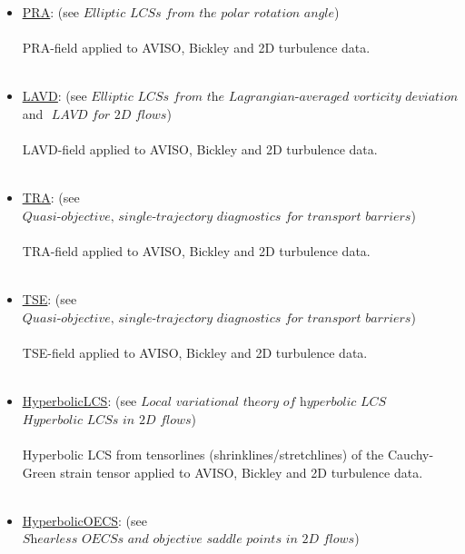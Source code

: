 \documentclass{article}
\begin{document}
\begin{enumerate}
\begin{enumerate}
\begin{enumerate}
\begin{itemize}
\item \href{https://github.com/EncinasBartos/TBarrier/tree/main/TBarrier/2D/demos/AdvectiveBarriers/PRA}{\underline{PRA}}: (see $ \textit{Elliptic LCSs from the polar rotation angle} $)\\ \\ PRA-field applied to AVISO, Bickley and 2D turbulence data. \\ \\
\item \href{https://github.com/EncinasBartos/TBarrier/tree/main/TBarrier/2D/demos/AdvectiveBarriers/LAVD}{\underline{LAVD}}: (see $ \textit{Elliptic LCSs from the Lagrangian-averaged vorticity deviation} $ and $ \textit{ LAVD for 2D flows} $)\\ \\
LAVD-field applied to AVISO, Bickley and 2D turbulence data. \\ \\
\item \href{https://github.com/EncinasBartos/TBarrier/tree/main/TBarrier/2D/demos/AdvectiveBarriers/TRA}{\underline{TRA}}: (see $ \textit{Quasi-objective, single-trajectory diagnostics for transport
barriers} $) \\ \\
TRA-field applied to AVISO, Bickley and 2D turbulence data. \\ \\
\item \href{https://github.com/EncinasBartos/TBarrier/tree/main/TBarrier/2D/demos/AdvectiveBarriers/TSE}{\underline{TSE}}: (see $ \textit{Quasi-objective, single-trajectory diagnostics for transport
barriers} $) \\ \\
TSE-field applied to AVISO, Bickley and 2D turbulence data. \\ \\
\item \href{https://github.com/EncinasBartos/TBarrier/tree/main/TBarrier/2D/demos/AdvectiveBarriers/HyperbolicLCS}{\underline{HyperbolicLCS}}: (see $ \textit{Local variational theory of hyperbolic LCS} $ $ \textit{Hyperbolic LCSs in 2D flows} $)\\ \\
Hyperbolic LCS from tensorlines (shrinklines/stretchlines) of the Cauchy-Green strain tensor applied to AVISO, Bickley and 2D turbulence data. \\ \\
\item \href{https://github.com/EncinasBartos/TBarrier/tree/main/TBarrier/2D/demos/AdvectiveBarriers/HyperbolicOECS}{\underline{HyperbolicOECS}}: (see $ \textit{Shearless OECSs and objective saddle points in 2D flows} $)\\ \\

\end{itemize}
\end{enumerate}
\end{enumerate}
\end{enumerate}
\end{document}
